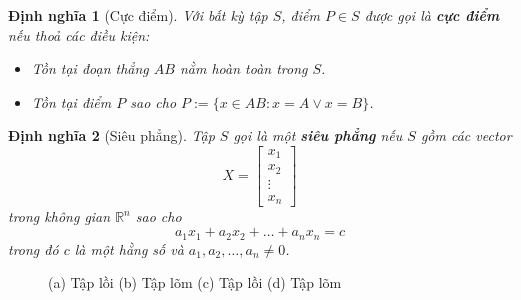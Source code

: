 \documentclass[12pt,a4paper]{report}
\newtheorem{dn}{Định nghĩa}
\begin{document}
\begin{dn}[Cực điểm]
Với bất kỳ tập $S$, điểm $P \in S$ được gọi là \textbf{cực điểm} nếu thoả các điều kiện:
\begin{itemize}
\item Tồn tại đoạn thẳng $AB$ nằm hoàn toàn trong $S$.
\item Tồn tại điểm $P$ sao cho $P := \{x \in AB: x=A \vee x=B \}$.
\end{itemize}
\end{dn}

\begin{dn}[Siêu phẳng]
Tập $S$ gọi là một \textbf{siêu phẳng} nếu $S$ gồm các vector
\begin{equation*}
X = \begin{bmatrix}
        x_1 \\
        x_2 \\
        \vdots \\
        x_n
	\end{bmatrix}
\end{equation*}
trong không gian $\mathbb{R}^n$ sao cho
\begin{equation*}
a_1x_1 + a_2x_2 + \ldots + a_nx_n = c
\end{equation*}
trong đó $c$ là một hằng số và $a_1,a_2,\ldots,a_n \neq 0$.
\end{dn}
\begin{figure}
	\centering
	\caption{(a) Tập lồi (b) Tập lõm (c) Tập lồi (d) Tập lõm}
	\label{fig:foobar}
\end{figure}
\end{document}
